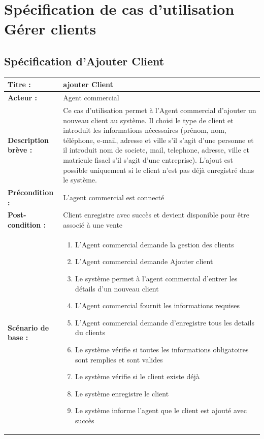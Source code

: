 \newpage
\section{Spécification de cas d'utilisation Gérer clients}

\subsection{Spécification d'Ajouter Client}

\begin{longtable}{|>{\bfseries}p{3.5cm}|p{\dimexpr\textwidth-3.5cm-4\tabcolsep-2\arrayrulewidth}|}
\hline
Titre : & ajouter Client \\
\hline
Acteur : & Agent commercial \\
\hline
Description brève : & Ce cas d'utilisation permet à l'Agent commercial d'ajouter un nouveau client au système. Il choisi le type de client et introduit les informations nécessaires (prénom, nom, téléphone, e-mail, adresse et ville s'il s'agit d'une personne et il introduit nom de societe, mail, telephone, adresse, ville et matricule fisacl s'il s'agit d'une entreprise). L'ajout est possible uniquement si le client n'est pas déjà enregistré dans le système. \\
\hline
Précondition : & L'agent commercial est connecté \\
\hline
Post-condition : & Client enregistre avec succès et devient disponible pour être associé à une vente \\
\hline
Scénario de base : &
\begin{enumerate}[leftmargin=1.5em, topsep=2pt, itemsep=1pt]
  \item L'Agent commercial demande la gestion des clients
  \item L'Agent commercial demande Ajouter client
  \item Le système permet à l'agent commercial d'entrer les détails d'un nouveau client
  \item L'Agent commercial fournit les informations requises
  \item L'Agent commercial demande d'enregistre tous les details du clients
  \item Le système vérifie si toutes les informations obligatoires sont remplies et sont valides
  \item Le système vérifie si le client existe déjà
  \item Le système enregistre le client 
  \item Le système informe l'agent que le client est ajouté avec succès

\end{enumerate}
\end{longtable}
